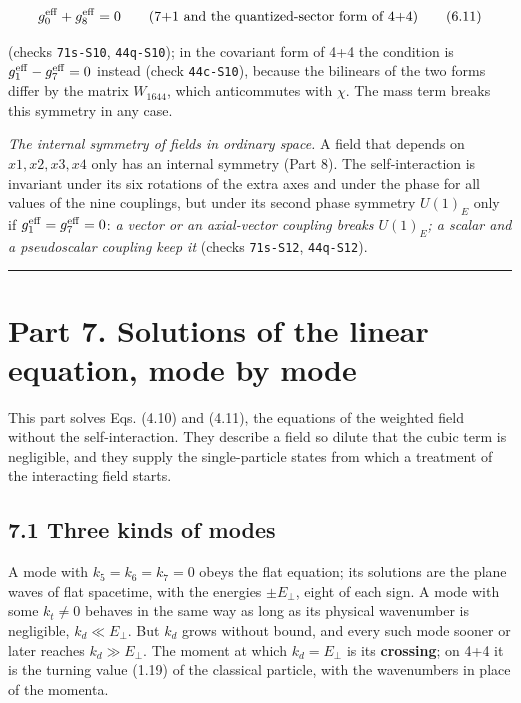 \documentclass[
  10pt,
]{article}
\begin{document}
\[g_0^{\rm eff}+g_8^{\rm eff}=0\qquad\text{(7+1 and the quantized-sector form of 4+4)}\tag{6.11}\]

(checks \texttt{71s-S10}, \texttt{44q-S10}); in the covariant form of
4+4 the condition is \(g_1^{\rm eff}-g_7^{\rm eff}=0\) instead (check
\texttt{44c-S10}), because the bilinears of the two forms differ by the
matrix \(W_{1644}\), which anticommutes with \(\chi\). The mass term
breaks this symmetry in any case.

\emph{The internal symmetry of fields in ordinary space.} A field that
depends on \(x1,x2,x3,x4\) only has an internal symmetry (Part 8). The
self-interaction is invariant under its six rotations of the extra axes
and under the phase for all values of the nine couplings, but under its
second phase symmetry \(U(1)_E\) only if
\(g_1^{\rm eff}=g_7^{\rm eff}=0\): \emph{a vector or an axial-vector
coupling breaks \(U(1)_E\); a scalar and a pseudoscalar coupling keep
it} (checks \texttt{71s-S12}, \texttt{44q-S12}).

\begin{center}\rule{0.5\linewidth}{0.5pt}\end{center}

\hypertarget{part-7.-solutions-of-the-linear-equation-mode-by-mode}{%
\section{Part 7. Solutions of the linear equation, mode by
mode}\label{part-7.-solutions-of-the-linear-equation-mode-by-mode}}

This part solves Eqs. (4.10) and (4.11), the equations of the weighted
field without the self-interaction. They describe a field so dilute that
the cubic term is negligible, and they supply the single-particle states
from which a treatment of the interacting field starts.

\hypertarget{three-kinds-of-modes}{%
\subsection{7.1 Three kinds of modes}\label{three-kinds-of-modes}}

A mode with \(k_5=k_6=k_7=0\) obeys the flat equation; its solutions are
the plane waves of flat spacetime, with the energies \(\pm E_\perp\),
eight of each sign. A mode with some \(k_t\neq0\) behaves in the same
way as long as its physical wavenumber is negligible,
\(k_d\ll E_\perp\). But \(k_d\) grows without bound, and every such mode
sooner or later reaches \(k_d\gg E_\perp\). The moment at which
\(k_d=E_\perp\) is its \textbf{crossing}; on 4+4 it is the turning value
(1.19) of the classical particle, with the wavenumbers in place of the
momenta.
\end{document}
